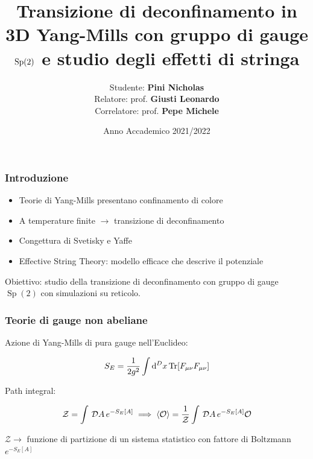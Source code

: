 \documentclass{beamer}
\title{Transizione di deconfinamento in 3D Yang-Mills con gruppo di gauge $\Sp(2)$ e studio degli effetti di stringa}
\author{\texorpdfstring{Studente: \textbf{Pini Nicholas}\\ \small Relatore: prof. \textbf{Giusti Leonardo}\\ \small Correlatore: prof. \textbf{Pepe Michele}}{Pini Nicholas}}
\institute
{
  Facoltà di Fisica Magistrale\\
  Università degli Studi di Milano Bicocca
}
\date
{Anno Accademico 2021/2022}
\newcommand{\D}[1]{\,\mathcal{D}#1\,}
\newcommand{\Z}{\mathcal{Z}}
\newcommand{\Sp}{\operatorname{Sp}}
\begin{document}
\beamertemplatenavigationsymbolsempty

\frame{\titlepage}


\begin{frame}
	\frametitle{Introduzione}

	\begin{itemize}
		\item Teorie di Yang-Mills presentano \alert{confinamento di colore}
		\item A temperature finite $\rightarrow$ transizione di deconfinamento
		\item Congettura di Svetisky e Yaffe
		\item Effective String Theory: modello efficace che descrive il potenziale 
	\end{itemize}

	\alert{Obiettivo}: studio della transizione di deconfinamento con gruppo di gauge $\Sp(2)$ con simulazioni su reticolo.

\end{frame}

\begin{frame}
	\frametitle{Teorie di gauge non abeliane}

	Azione di Yang-Mills di pura gauge nell'Euclideo:

	\begin{equation*}
		S_E = \frac{1}{2g^2} \int \dd[D]{x} \Tr[F_{\mu\nu}F_{\mu\nu}]
	\end{equation*}

	Path integral:

	\begin{equation*}
		\Z = \int \D{A} e^{-S_E[A]} \implies \expval{\mathcal{O}} = \frac{1}{\Z} \int \D{A} e^{-S_E[A]} \mathcal{O}
	\end{equation*}

	$\Z \rightarrow$ \alert{funzione di partizione} di un sistema statistico con fattore di Boltzmann $e^{-S_E[A]}$

\end{frame}
\end{document}
